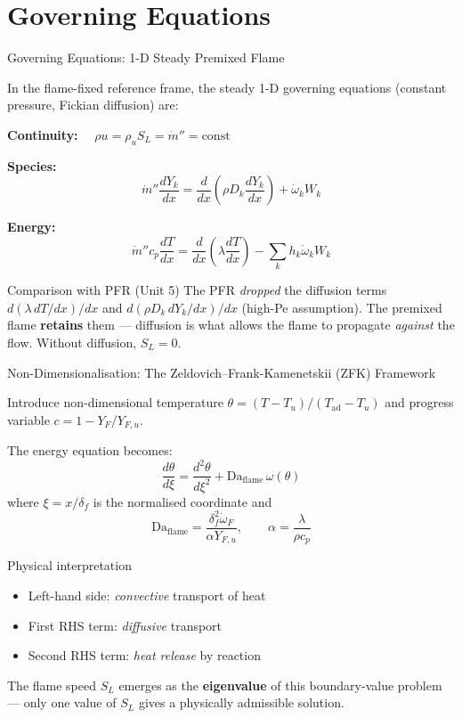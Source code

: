\documentclass[12pt,aspectratio=169]{beamer}
\newcommand{\Da}{\mathrm{Da}}
\newcommand{\ddx}[1]{\frac{d#1}{dx}}
\newcommand{\Tad}{T_{\text{ad}}}
\newcommand{\Tu}{T_u}
\newcommand{\mdot}{\dot{m}}
\newcommand{\wdot}{\dot{\omega}}
\newcommand{\SL}{S_L}
\newcommand{\lf}{\delta_f}
\newcommand{\alphath}{\alpha}
\begin{document}
\section{Governing Equations}

\begin{frame}{Governing Equations: 1-D Steady Premixed Flame}

  In the flame-fixed reference frame, the steady 1-D governing equations
  (constant pressure, Fickian diffusion) are:

  \medskip
  \textbf{Continuity:} $\quad \rho u = \rho_u \SL = \mdot'' = \text{const}$

  \medskip
  \textbf{Species:}
  \[
    \mdot'' \ddx{Y_k}
    = \ddx{}\!\left(\rho D_k \ddx{Y_k}\right) + \wdot_k W_k
  \]

  \textbf{Energy:}
  \[
    \mdot'' c_p \ddx{T}
    = \ddx{}\!\left(\lambda \ddx{T}\right)
      - \sum_k h_k \wdot_k W_k
  \]

  \begin{block}{Comparison with PFR (Unit 5)}
    The PFR \emph{dropped} the diffusion terms $d(\lambda\,dT/dx)/dx$
    and $d(\rho D_k\,dY_k/dx)/dx$ (high-Pe assumption).
    The premixed flame \textbf{retains} them --- diffusion is what
    allows the flame to propagate \emph{against} the flow.
    Without diffusion, $\SL = 0$.
  \end{block}
\end{frame}

\begin{frame}{Non-Dimensionalisation: The Zeldovich--Frank-Kamenetskii (ZFK) Framework}

  Introduce non-dimensional temperature $\theta = (T - \Tu)/(\Tad - \Tu)$
  and progress variable $c = 1 - Y_F/Y_{F,u}$.

  The energy equation becomes:
  \[
    \frac{d\theta}{d\xi} = \frac{d^2\theta}{d\xi^2} + \Da_{\text{flame}}\,\omega(\theta)
  \]
  where $\xi = x/\lf$ is the normalised coordinate and
  \[
    \Da_{\text{flame}} = \frac{\lf^2 \wdot_F}{\alphath Y_{F,u}}, \qquad
    \alphath = \frac{\lambda}{\rho c_p}
  \]

  \begin{block}{Physical interpretation}
    \begin{itemize}
      \item Left-hand side: \emph{convective} transport of heat
      \item First RHS term: \emph{diffusive} transport
      \item Second RHS term: \emph{heat release} by reaction
    \end{itemize}
    The flame speed $\SL$ emerges as the \textbf{eigenvalue} of this
    boundary-value problem ---
    only one value of $\SL$ gives a physically admissible solution.
  \end{block}
\end{frame}
\end{document}
